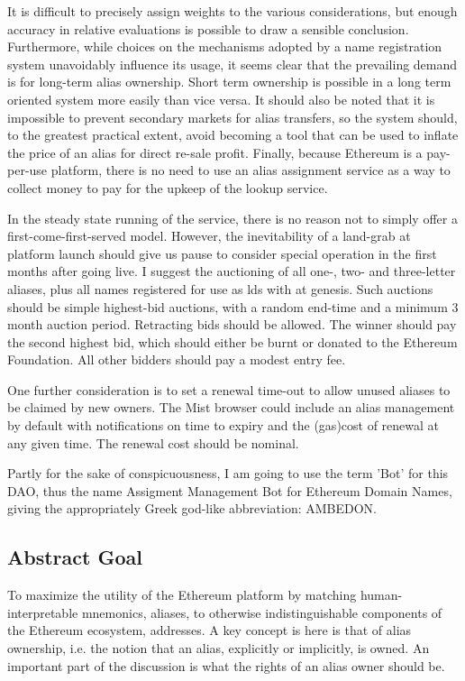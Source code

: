\documentclass[10pt,a4paper]{article}
\begin{document}
It is difficult to precisely assign weights to the various considerations, but enough accuracy in relative evaluations is possible to draw a sensible conclusion. Furthermore, while choices on the mechanisms adopted by a name registration system unavoidably influence its usage, it seems clear that the prevailing demand is for long-term alias ownership. Short term ownership is possible in a long term oriented system more easily than vice versa. It should also be noted that it is impossible to prevent secondary markets for alias transfers, so the system should, to the greatest practical extent, avoid becoming a tool that can be used to inflate the price of an alias for direct re-sale profit. Finally, because Ethereum is a pay-per-use platform, there is no need to use an alias assignment service as a way to collect money to pay for the upkeep of the lookup service. 

In the steady state running of the service, there is no reason not to simply offer a first-come-first-served model. However, the inevitability of a land-grab at platform launch should give us pause to consider special operation in the first months after going live. I suggest the auctioning of all one-, two- and three-letter aliases, plus all names registered for use as 	lds with \icann at genesis. Such auctions should be simple highest-bid auctions, with a random end-time and a minimum 3 month auction period. Retracting bids should be allowed. The winner should pay the second highest bid, which should either be burnt or donated to the Ethereum Foundation. All other bidders should pay a modest entry fee.

One further consideration is to set a renewal time-out to allow unused aliases to be claimed by new owners. The Mist browser could include an alias management \dapp by default with notifications on time to expiry and the (gas)cost of renewal at any given time. The renewal cost should be nominal.

Partly for the sake of conspicuousness, I am going to use the term 'Bot' for this DAO, thus the name Assigment Management Bot for Ethereum Domain Names, giving the appropriately Greek god-like abbreviation: AMBEDON.


\subsection*{Abstract Goal}
To maximize the utility of the Ethereum platform by matching human-interpretable mnemonics, aliases, to otherwise indistinguishable components of the Ethereum ecosystem, addresses. A key concept is here is that of alias ownership, i.e. the notion that an alias, explicitly or implicitly, is owned. An important part of the discussion is what the rights of an alias owner should be.
\end{document}
